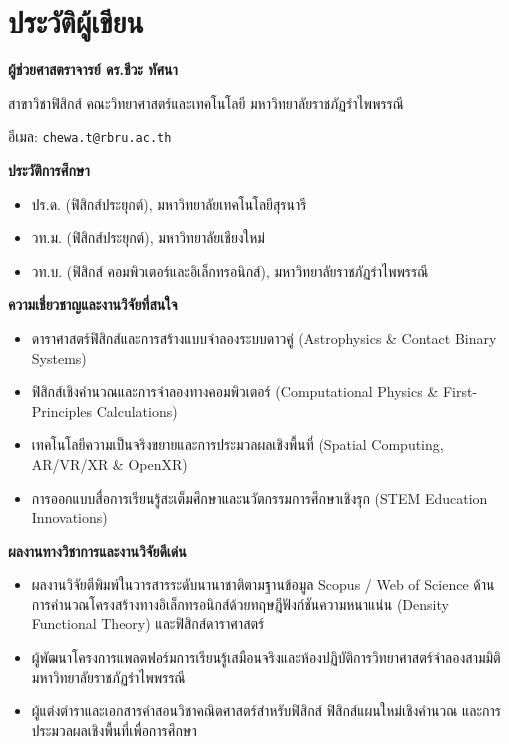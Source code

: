 \chapter*{ประวัติผู้เขียน}

\begin{center}
    \vspace*{0.5cm}
    {\Large\bfseries ผู้ช่วยศาสตราจารย์ ดร.ชีวะ ทัศนา\par}
    \vspace{0.2cm}
    {\normalsize สาขาวิชาฟิสิกส์ คณะวิทยาศาสตร์และเทคโนโลยี มหาวิทยาลัยราชภัฏรำไพพรรณี\par}
    {\normalsize อีเมล: \texttt{chewa.t@rbru.ac.th}\par}
    \vspace{0.8cm}
\end{center}

\noindent\textbf{ประวัติการศึกษา}
\begin{itemize}[leftmargin=2.0em, itemsep=4pt]
    \item ปร.ด. (ฟิสิกส์ประยุกต์), มหาวิทยาลัยเทคโนโลยีสุรนารี
    \item วท.ม. (ฟิสิกส์ประยุกต์), มหาวิทยาลัยเชียงใหม่
    \item วท.บ. (ฟิสิกส์ คอมพิวเตอร์และอิเล็กทรอนิกส์), มหาวิทยาลัยราชภัฏรำไพพรรณี
\end{itemize}

\vspace{0.6cm}
\noindent\textbf{ความเชี่ยวชาญและงานวิจัยที่สนใจ}
\begin{itemize}[leftmargin=2.0em, itemsep=4pt]
    \item ดาราศาสตร์ฟิสิกส์และการสร้างแบบจำลองระบบดาวคู่ (Astrophysics \& Contact Binary Systems)
    \item ฟิสิกส์เชิงคำนวณและการจำลองทางคอมพิวเตอร์ (Computational Physics \& First-Principles Calculations)
    \item เทคโนโลยีความเป็นจริงขยายและการประมวลผลเชิงพื้นที่ (Spatial Computing, AR/VR/XR \& OpenXR)
    \item การออกแบบสื่อการเรียนรู้สะเต็มศึกษาและนวัตกรรมการศึกษาเชิงรุก (STEM Education Innovations)
\end{itemize}

\vspace{0.6cm}
\noindent\textbf{ผลงานทางวิชาการและงานวิจัยดีเด่น}
\begin{itemize}[leftmargin=2.0em, itemsep=4pt]
    \item ผลงานวิจัยตีพิมพ์ในวารสารระดับนานาชาติตามฐานข้อมูล Scopus / Web of Science ด้านการคำนวณโครงสร้างทางอิเล็กทรอนิกส์ด้วยทฤษฎีฟังก์ชันความหนาแน่น (Density Functional Theory) และฟิสิกส์ดาราศาสตร์
    \item ผู้พัฒนาโครงการแพลตฟอร์มการเรียนรู้เสมือนจริงและห้องปฏิบัติการวิทยาศาสตร์จำลองสามมิติ มหาวิทยาลัยราชภัฏรำไพพรรณี
    \item ผู้แต่งตำราและเอกสารคำสอนวิชาคณิตศาสตร์สำหรับฟิสิกส์ ฟิสิกส์แผนใหม่เชิงคำนวณ และการประมวลผลเชิงพื้นที่เพื่อการศึกษา
\end{itemize}
\clearpage
